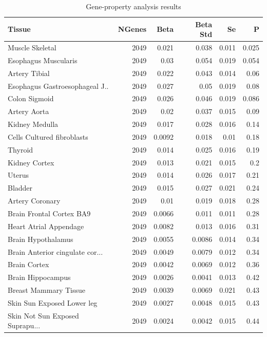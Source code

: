 \documentclass{article}
\begin{document}
\begin{table}[h!]
\vspace{-7.5em}%
\renewcommand{\thetable}{S\arabic{table}}
\centering
\caption{Gene-property analysis results}
\begin{tabular}{lrrrrr}
  \hline
Tissue & NGenes & Beta & Beta Std & Se & P \\ 
  \hline
Muscle Skeletal & 2049 & 0.021 & 0.038 & 0.011 & 0.025 \\ 
  Esophagus Muscularis & 2049 & 0.03 & 0.054 & 0.019 & 0.054 \\ 
  Artery Tibial  & 2049 & 0.022 & 0.043 & 0.014 & 0.06 \\ 
  Esophagus Gastroesophageal J.. & 2049 & 0.027 & 0.05 & 0.019 & 0.08 \\ 
  Colon Sigmoid & 2049 & 0.026 & 0.046 & 0.019 & 0.086 \\ 
  Artery Aorta  & 2049 & 0.02 & 0.037 & 0.015 & 0.09 \\ 
  Kidney Medulla & 2049 & 0.017 & 0.028 & 0.016 & 0.14 \\ 
  Cells Cultured fibroblasts & 2049 & 0.0092 & 0.018 & 0.01 & 0.18 \\ 
  Thyroid & 2049 & 0.014 & 0.025 & 0.016 & 0.19 \\ 
  Kidney Cortex & 2049 & 0.013 & 0.021 & 0.015 & 0.2 \\ 
  Uterus & 2049 & 0.014 & 0.026 & 0.017 & 0.21 \\ 
  Bladder  & 2049 & 0.015 & 0.027 & 0.021 & 0.24 \\ 
  Artery Coronary & 2049 & 0.01 & 0.019 & 0.018 & 0.28 \\ 
  Brain Frontal Cortex BA9 & 2049 & 0.0066 & 0.011 & 0.011 & 0.28 \\ 
  Heart Atrial Appendage & 2049 & 0.0082 & 0.013 & 0.016 & 0.31 \\ 
  Brain Hypothalamus & 2049 & 0.0055 & 0.0086 & 0.014 & 0.34 \\ 
  Brain Anterior cingulate cor... & 2049 & 0.0049 & 0.0079 & 0.012 & 0.34 \\ 
  Brain Cortex & 2049 & 0.0042 & 0.0069 & 0.012 & 0.36 \\ 
  Brain Hippocampus & 2049 & 0.0026 & 0.0041 & 0.013 & 0.42 \\ 
  Breast Mammary Tissue & 2049 & 0.0039 & 0.0069 & 0.021 & 0.43 \\ 
  Skin Sun Exposed Lower leg & 2049 & 0.0027 & 0.0048 & 0.015 & 0.43 \\ 
  Skin Not Sun Exposed Suprapu... & 2049 & 0.0024 & 0.0042 & 0.015 & 0.44 \\ 

\end{tabular}
\end{table}
\end{document}
